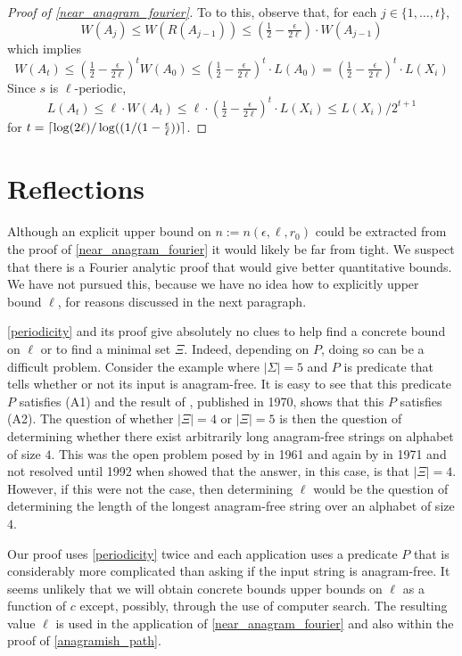 \documentclass{patmorin}
\begin{document}
\begin{proof}[Proof of \cref{near_anagram_fourier}]
  To to this, observe that, for each $j\in\{1,\ldots,t\}$,
  \begin{equation}
      W(A_j)
        \le W(R(A_{j-1}))
        \le (\tfrac12-\tfrac{\epsilon}{2\ell})\cdot W(A_{j-1})
  \end{equation}
  which implies
  \[
       W(A_t)
       \le (\tfrac12-\tfrac{\epsilon}{2\ell})^t W(A_0) \le (\tfrac12-\tfrac{\epsilon}{2\ell})^t\cdot L(A_0)
       =  (\tfrac12-\tfrac{\epsilon}{2\ell})^t\cdot L(X_i)
  \]
  Since $s$ is $\ell$-periodic,
  \[
        L(A_t)\le \ell\cdot W(A_t) \le \ell\cdot(\tfrac12-\tfrac{\epsilon}{2\ell})^t\cdot L(X_i) \le L(X_i)/2^{t+1}
  \]
  for $t = {\lceil \log(2\ell)/\log((1/(1-\tfrac{\epsilon}{\ell})) \rceil}$.
\end{proof}

\section{Reflections}

Although an explicit upper bound on $n:=n(\epsilon,\ell,r_0)$ could be extracted from the proof of \cref{near_anagram_fourier} it would likely be far from tight.  We suspect that there is a Fourier analytic proof that would give better quantitative bounds.  We have not pursued this, because we have no idea how to explicitly upper bound $\ell$, for reasons discussed in the next paragraph.

\cref{periodicity} and its proof give absolutely no clues to help find a concrete bound on $\ell$ or to find a minimal set $\Xi$. Indeed, depending on $P$, doing so can be a difficult problem.  Consider the example where $|\Sigma|=5$ and $P$ is predicate that tells whether or not its input is anagram-free. It is easy to see that this predicate $P$ satisfies (A1) and the result of \citet{pleasants:non-repetitive}, published in 1970, shows that this $P$ satisfies (A2).  The question of whether $|\Xi|=4$ or $|\Xi|=5$ is then the question of determining whether there exist arbitrarily long anagram-free strings on alphabet of size $4$.  This was the open problem posed by \citet{erdos:some} in 1961 and again by \citet{brown:is} in 1971 and not resolved until 1992 when \citet{keranen:abelian,keranen:powerful} showed that the answer, in this case, is that $|\Xi|=4$.  However, if this were not the case, then determining $\ell$ would be the question of determining the length of the longest anagram-free string over an alphabet of size $4$.

Our proof uses \cref{periodicity} twice and each application uses a predicate $P$ that is considerably more complicated than asking if the input string is anagram-free. It seems unlikely that we will obtain concrete bounds upper bounds on $\ell$ as a function of $c$ except, possibly, through the use of computer search. The resulting value $\ell$ is used in the application of \cref{near_anagram_fourier} and also within the proof of \cref{anagramish_path}.





\end{document}
